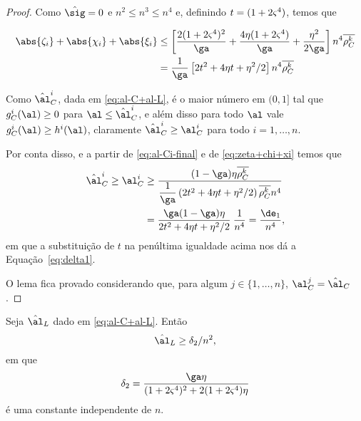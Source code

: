 \begin{proof}
Como $\nextsig = 0$ e $n^{2}\leq n^{3}\leq  n^{4}$ e, definindo $t = (1 + 2\varsigma^{4})$, temos que 

	\begin{align}
	\abs{\zeta_i} + \abs{\chi_i} + \abs{\xi_i} & \leq \left[ \frac{2(1 + 2\bdxzstar^{4})^{2} }{\ga} + 												\dfrac{4\eta(1+2\bdxzstar^{4})}{\ga} +	 \dfrac{\eta^{2}}{2\ga} \right] n^{4}\rhoCkb \notag \\
										& =	\dfrac{1}{\ga}\left[ 2t^{2} + 4\eta t + \eta^{2}/2 \right] n^{4}\rhoCkb
										\label{eq:zeta+chi+xi}
	\end{align}

Como $\nextal^{i}_{C}$, dada em \eqref{eq:al-C+al-L}, é o maior número em $(0,1]$ tal que $g_{C}^{i}(\al)\geq 0$ para $\al\leq\nextal^{i}_{C}$, e além disso para todo $\al$ vale $g_{C}^{i}(\al) \geq h^{i}(\al)$, claramente $\nextal^{i}_{C} \geq  \al_{C}^i$ para todo $i=1,\ldots,n$.


Por conta disso, e a partir  de \eqref{eq:al-Ci-final} e de \eqref{eq:zeta+chi+xi} temos que 
\[
\begin{aligned}
\nextal_{C}^i \geq \al_{C}^{i} & \geq \dfrac{(1-\ga)\eta\rhoCkb}{\dfrac{1}{\ga}\left( 2t^{2} + 4\eta t + \eta^{2}/2 \right)\rhoCkb n^{4} } \\			 
							& = \dfrac{\ga(1-\ga)\eta}{ 2t^{2} + 4\eta t + \eta^{2}/2 } \:\dfrac{1}{n^{4}} = \dfrac{\de_{1}}{n^{4}},
\end{aligned}
\]
em que a substituição de $t$ na penúltima igualdade acima nos dá a Equação~\eqref{eq:delta1}.

 O lema fica provado considerando que, para algum $j\in\{1,\ldots,n\}$, $ \al_{C}^{j}=\nextal_{C} $.
 \end{proof}






\begin{lema}\label{lemma:alL_delta-2}
Seja $\nextal_{L}$ dado em \eqref{eq:al-C+al-L}. Então 
\[
\nextal_{L} \geq \delta_{2}/n^{2},
\]em que 
\begin{equation}
	\label{eq:delta2}
	\delta_{2} = \dfrac{\ga\eta } {(1 + 2\bdxzstar^{4})^{2}  + 2(1+2\bdxzstar^{4})\eta}
\end{equation}
é uma constante independente de $n$.
\end{lema}


